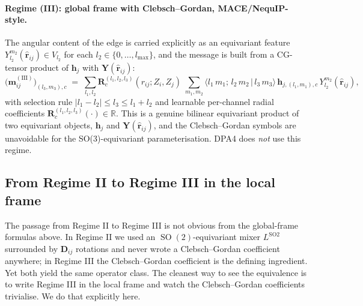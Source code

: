 \documentclass[11pt,a4paper]{article}
\DeclareMathOperator{\SO}{SO}
\newcommand{\R}{\mathbb{R}}
\newcommand{\brh}{\hat{\bm{r}}}
\newcommand{\bh}{\bm{h}}
\newcommand{\bD}{\bm{D}}
\newcommand{\lmax}{l_{\max}}
\theoremstyle{plain}
\theoremstyle{definition}
\theoremstyle{remark}
\begin{document}
    \paragraph{Regime (III): global frame with Clebsch--Gordan, MACE/NequIP-style.}
    The angular content of the edge is carried explicitly as an equivariant feature
$Y_{l_2}^{m_2}(\brh_{ij})\in V_{l_2}$ for each $l_2\in\{0,\dots,\lmax\}$, and
    the message is built from a CG-tensor product of $\bh_j$ with
$\bm{Y}(\brh_{ij})$:
    \begin{equation}\label{eq:regIII-msg}
        \bigl(\bm{m}_{ij}^{\mathrm{(III)}}\bigr)_{(l_3,m_3),c}
        \;=\;\sum_{l_1,l_2}\bm{R}^{(l_1,l_2,l_3)}_{c}(r_{ij};Z_i,Z_j)\;\sum_{m_1,m_2}\bigl\langle l_1\,m_1;\,l_2\,m_2\,\big|\,l_3\,m_3\bigr\rangle\,\bh_{j,(l_1,m_1),c}\,Y_{l_2}^{m_2}(\brh_{ij}),
    \end{equation}
    with selection rule $|l_1-l_2|\le l_3\le l_1+l_2$ and learnable per-channel radial coefficients $\bm{R}^{(l_1,l_2,l_3)}_c(\cdot)\in\R$.
    This is a genuine bilinear equivariant product of two equivariant objects, $\bh_j$ and $\bm{Y}(\brh_{ij})$, and the Clebsch--Gordan symbols are unavoidable for the SO(3)-equivariant parameterisation.
    DPA4 does \emph{not} use this regime.

    \subsection{From Regime II to Regime III in the local frame}\label{sec:II-to-III}

    The passage from Regime II to Regime III is not obvious from the global-frame
    formulas above. In Regime II we used an $\SO(2)$-equivariant mixer
$L^{\mathrm{SO2}}$ surrounded by $\bD_{ij}$ rotations and never wrote a
    Clebsch--Gordan coefficient anywhere; in Regime III the Clebsch--Gordan
    coefficient is the defining ingredient. Yet both yield the same operator class.
    The cleanest way to see the equivalence is to write Regime III in the local
    frame and watch the Clebsch--Gordan coefficients trivialise. We do that
    explicitly here.
\end{document}
